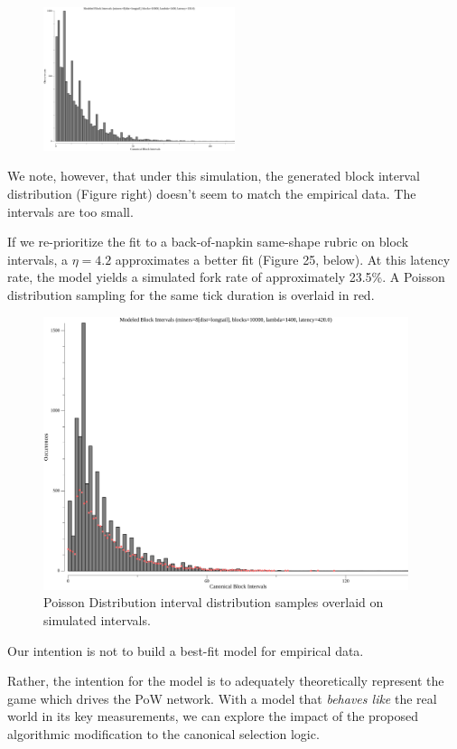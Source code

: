 \documentclass[11pt]{article}
\theoremstyle{plain}
\begin{document}
{\begin{figure}
    \centering
    \includegraphics[width=0.5\textwidth]{imgs/sim_a_anteater.png}
\end{figure}

We note, however, that under this simulation, the generated block interval
distribution (Figure right) doesn't seem to match the empirical data.
The intervals are too small.

If we re-prioritize the fit to a back-of-napkin same-shape rubric on block
intervals, a $\eta=4.2$ approximates a better fit (Figure 25, below). At this
latency rate, the model yields a simulated fork rate of approximately 23.5\%.
A Poisson distribution sampling for the same tick duration is overlaid in red.

\begin{figure}[tph]
    \centering
    \includegraphics[height=8cm]{imgs/sim_a_bravo.png}
    \caption{
      Poisson Distribution interval distribution samples
      overlaid on simulated intervals.
    }
    \label{fig:sim_a_bravo}
\end{figure}

Our intention is not to build a best-fit model for empirical data.

Rather, the intention for the model is to adequately theoretically represent the game
which drives the PoW network. With a model that \emph{behaves like} the real
world in its key measurements, we can explore the impact of the proposed
algorithmic modification to the canonical selection logic.

}
\end{document}

